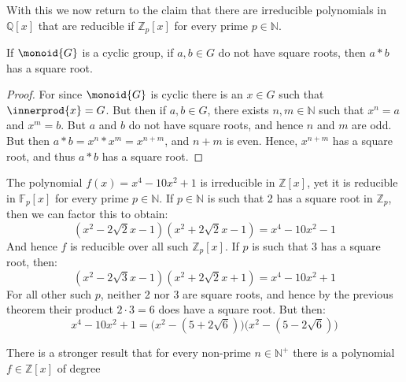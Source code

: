 \documentclass{article}                                                        %
\begin{document}
        With this we now return to the claim that there are irreducible
        polynomials in $\mathbb{Q}[x]$ that are reducible if $\mathbb{Z}_{p}[x]$
        for every prime $p\in\mathbb{N}$.
        \begin{theorem}
            If $\monoid{G}$ is a cyclic group, if $a,b\in{G}$ do not have
            square roots, then $a*b$ has a square root.
        \end{theorem}
        \begin{proof}
            For since $\monoid{G}$ is cyclic there is an $x\in{G}$ such that
            $\innerprod{x}=G$. But then if $a,b\in{G}$, there exists
            $n,m\in\mathbb{N}$ such that $x^{n}=a$ and $x^{m}=b$. But $a$ and
            $b$ do not have square roots, and hence $n$ and $m$ are odd. But
            then $a*b=x^{n}*x^{m}=x^{n+m}$, and $n+m$ is even. Hence,
            $x^{n+m}$ has a square root, and thus $a*b$ has a square root.
        \end{proof}
        \begin{example}
            The polynomial $f(x)=x^{4}-10x^{2}+1$ is irreducible in
            $\mathbb{Z}[x]$, yet it is reducible in $\mathbb{F}_{p}[x]$ for
            every prime $p\in\mathbb{N}$. If $p\in\mathbb{N}$ is such that
            2 has a square root in $\mathbb{Z}_{p}$, then we can factor this
            to obtain:
            \begin{equation}
                (x^{2}-2\sqrt{2}x-1)(x^{2}+2\sqrt{2}x-1)
                =x^{4}-10x^{2}-1
            \end{equation}
            And hence $f$ is reducible over all such $\mathbb{Z}_{p}[x]$. If $p$
            is such that 3 has a square root, then:
            \begin{equation}
                (x^{2}-2\sqrt{3}x-1)(x^{2}+2\sqrt{2}x+1)
                =x^{4}-10x^{2}+1
            \end{equation}
            For all other such $p$, neither 2 nor 3 are square roots, and hence
            by the previous theorem their product $2\cdot{3}=6$ does have a
            square root. But then:
            \begin{equation}
                x^{4}-10x^{2}+1=
                    \big(x^{2}-(5+2\sqrt{6})\big)\big(x^{2}-(5-2\sqrt{6})\big)
            \end{equation}
        \end{example}
        There is a stronger result that for every non-prime
        $n\in\mathbb{N}^{+}$ there is a polynomial $f\in\mathbb{Z}[x]$ of degree
\end{document}
